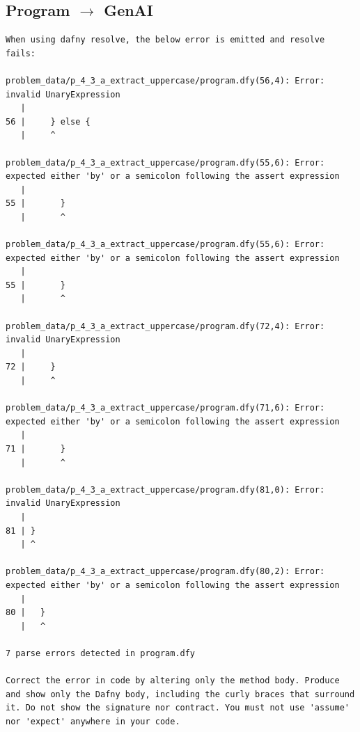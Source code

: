 \documentclass{article}
\begin{document}
\subsection*{Program $\rightarrow$ GenAI}
\begin{lstlisting}
When using dafny resolve, the below error is emitted and resolve fails:

problem_data/p_4_3_a_extract_uppercase/program.dfy(56,4): Error: invalid UnaryExpression
   |
56 |     } else {
   |     ^

problem_data/p_4_3_a_extract_uppercase/program.dfy(55,6): Error: expected either 'by' or a semicolon following the assert expression
   |
55 |       }
   |       ^

problem_data/p_4_3_a_extract_uppercase/program.dfy(55,6): Error: expected either 'by' or a semicolon following the assert expression
   |
55 |       }
   |       ^

problem_data/p_4_3_a_extract_uppercase/program.dfy(72,4): Error: invalid UnaryExpression
   |
72 |     }
   |     ^

problem_data/p_4_3_a_extract_uppercase/program.dfy(71,6): Error: expected either 'by' or a semicolon following the assert expression
   |
71 |       }
   |       ^

problem_data/p_4_3_a_extract_uppercase/program.dfy(81,0): Error: invalid UnaryExpression
   |
81 | }
   | ^

problem_data/p_4_3_a_extract_uppercase/program.dfy(80,2): Error: expected either 'by' or a semicolon following the assert expression
   |
80 |   }
   |   ^

7 parse errors detected in program.dfy

Correct the error in code by altering only the method body. Produce and show only the Dafny body, including the curly braces that surround it. Do not show the signature nor contract. You must not use 'assume' nor 'expect' anywhere in your code.
\end{lstlisting}
\end{document}
